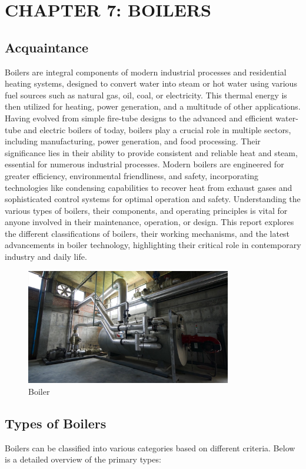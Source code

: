 \section{CHAPTER 7: BOILERS}
\subsection{Acquaintance}
Boilers are integral components of modern industrial processes and residential heating systems, designed to convert water into steam or hot water using various fuel sources such as natural gas, oil, coal, or electricity. This thermal energy is then utilized for heating, power generation, and a multitude of other applications. Having evolved from simple fire-tube designs to the advanced and efficient water-tube and electric boilers of today, boilers play a crucial role in multiple sectors, including manufacturing, power generation, and food processing. Their significance lies in their ability to provide consistent and reliable heat and steam, essential for numerous industrial processes. Modern boilers are engineered for greater efficiency, environmental friendliness, and safety, incorporating technologies like condensing capabilities to recover heat from exhaust gases and sophisticated control systems for optimal operation and safety. Understanding the various types of boilers, their components, and operating principles is vital for anyone involved in their maintenance, operation, or design. This report explores the different classifications of boilers, their working mechanisms, and the latest advancements in boiler technology, highlighting their critical role in contemporary industry and daily life.

\begin{figure}[h]
\centering
\includegraphics[width=0.8\textwidth]{figs/boiler.jpg}
\caption{Boiler}
\label{fig:boiler}
\end{figure}


\subsection{Types of Boilers \cite{steam_boilers}}
Boilers can be classified into various categories based on different criteria. Below is a detailed overview of the primary types:

